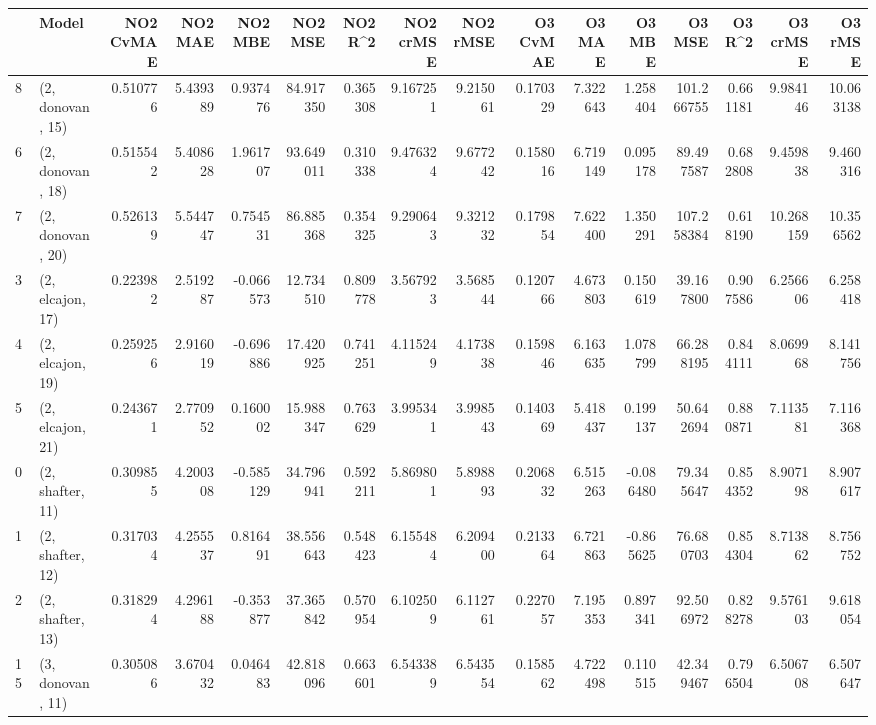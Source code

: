 \begin{tabular}{llrrrrrrrrrrrrrr}
\toprule
{} &             Model &  NO2 CvMAE &   NO2 MAE &   NO2 MBE &    NO2 MSE &   NO2 R\textasciicircum2 &  NO2 crMSE &  NO2 rMSE &  O3 CvMAE &    O3 MAE &    O3 MBE &      O3 MSE &    O3 R\textasciicircum2 &   O3 crMSE &    O3 rMSE \\
\midrule
8  &  (2, donovan, 15) &   0.510776 &  5.439389 &  0.937476 &  84.917350 &  0.365308 &   9.167251 &  9.215061 &  0.170329 &  7.322643 &  1.258404 &  101.266755 &  0.661181 &   9.984146 &  10.063138 \\
6  &  (2, donovan, 18) &   0.515542 &  5.408628 &  1.961707 &  93.649011 &  0.310338 &   9.476324 &  9.677242 &  0.158016 &  6.719149 &  0.095178 &   89.497587 &  0.682808 &   9.459838 &   9.460316 \\
7  &  (2, donovan, 20) &   0.526139 &  5.544747 &  0.754531 &  86.885368 &  0.354325 &   9.290643 &  9.321232 &  0.179854 &  7.622400 &  1.350291 &  107.258384 &  0.618190 &  10.268159 &  10.356562 \\
3  &  (2, elcajon, 17) &   0.223982 &  2.519287 & -0.066573 &  12.734510 &  0.809778 &   3.567923 &  3.568544 &  0.120766 &  4.673803 &  0.150619 &   39.167800 &  0.907586 &   6.256606 &   6.258418 \\
4  &  (2, elcajon, 19) &   0.259256 &  2.916019 & -0.696886 &  17.420925 &  0.741251 &   4.115249 &  4.173838 &  0.159846 &  6.163635 &  1.078799 &   66.288195 &  0.844111 &   8.069968 &   8.141756 \\
5  &  (2, elcajon, 21) &   0.243671 &  2.770952 &  0.160002 &  15.988347 &  0.763629 &   3.995341 &  3.998543 &  0.140369 &  5.418437 &  0.199137 &   50.642694 &  0.880871 &   7.113581 &   7.116368 \\
0  &  (2, shafter, 11) &   0.309855 &  4.200308 & -0.585129 &  34.796941 &  0.592211 &   5.869801 &  5.898893 &  0.206832 &  6.515263 & -0.086480 &   79.345647 &  0.854352 &   8.907198 &   8.907617 \\
1  &  (2, shafter, 12) &   0.317034 &  4.255537 &  0.816491 &  38.556643 &  0.548423 &   6.155484 &  6.209400 &  0.213364 &  6.721863 & -0.865625 &   76.680703 &  0.854304 &   8.713862 &   8.756752 \\
2  &  (2, shafter, 13) &   0.318294 &  4.296188 & -0.353877 &  37.365842 &  0.570954 &   6.102509 &  6.112761 &  0.227057 &  7.195353 &  0.897341 &   92.506972 &  0.828278 &   9.576103 &   9.618054 \\
15 &  (3, donovan, 11) &   0.305086 &  3.670432 &  0.046483 &  42.818096 &  0.663601 &   6.543389 &  6.543554 &  0.158562 &  4.722498 &  0.110515 &   42.349467 &  0.796504 &   6.506708 &   6.507647 \\

\end{tabular}
